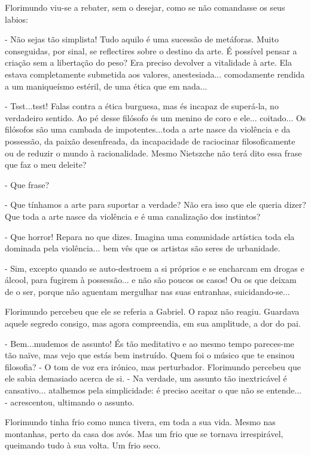 Florimundo viu-se a rebater, sem o desejar, como se não comandasse os
seus labios:

- Não sejas tão simplista! Tudo aquilo é uma sucessão de metáforas.
Muito conseguidas, por sinal, se reflectires sobre o destino da arte. É
possível pensar a criação sem a libertação do peso? Era preciso devolver
a vitalidade à arte. Ela estava completamente submetida aos valores,
anestesiada... comodamente rendida a um maniqueísmo estéril, de uma
ética que em nada...

- Tsst...tsst! Falas contra a ética burguesa, mas és incapaz de
superá-la, no verdadeiro sentido. Ao pé desse filósofo és um menino de
coro e ele... coitado... Os filósofos são uma cambada de
impotentes...toda a arte nasce da violência e da possessão, da paixão
desenfreada, da incapacidade de raciocinar filosoficamente ou de reduzir
o mundo à racionalidade. Mesmo Nietszche não terá dito essa frase que
faz o meu deleite?

- Que frase?

- Que tínhamos a arte para suportar a verdade? Não era isso que ele
queria dizer? Que toda a arte nasce da violência e é uma canalização dos
instintos?

- Que horror! Repara no que dizes. Imagina uma comunidade artística toda
ela dominada pela violência... bem vês que os artistas são seres de
urbanidade.

- Sim, excepto quando se auto-destroem a si próprios e se encharcam em
drogas e álcool, para fugirem à possessão... e não são poucos os casos!
Ou os que deixam de o ser, porque não aguentam mergulhar nas suas
entranhas, suicidando-se...

Florimundo percebeu que ele se referia a Gabriel. O rapaz não reagiu.
Guardava aquele segredo consigo, mas agora compreendia, em sua
amplitude, a dor do pai.

- Bem...mudemos de assunto! És tão meditativo e ao mesmo tempo
pareces-me tão naïve, mas vejo que estás bem instruído. Quem foi o
músico que te ensinou filosofia? - O tom de voz era irónico, mas
perturbador. Florimundo percebeu que ele sabia demasiado acerca de si. -
Na verdade, um assunto tão inextricável é cansativo... atalhemos pela
simplicidade: é preciso aceitar o que não se entende... - acrescentou,
ultimando o assunto.

Florimundo tinha frio como nunca tivera, em toda a sua vida. Mesmo nas
montanhas, perto da casa dos avós. Mas um frio que se tornava
irrespirável, queimando tudo à sua volta. Um frio seco.


